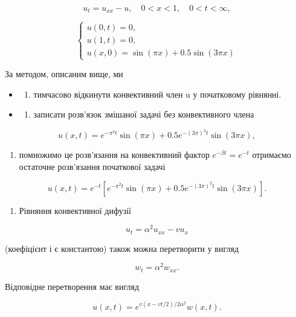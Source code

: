 \documentclass[
  ukrainian,
]{article}
\providecommand{\tightlist}{%
  \setlength{\itemsep}{0pt}\setlength{\parskip}{0pt}}
\begin{document}
\[
u_t = u_{xx} - u, \quad 0 < x < 1, \quad 0 < t < \infty,
\]

\[
\begin{cases} u(0, t) = 0, \\ u(1, t) = 0, \\ u(x, 0) = \sin(\pi x) + 0.5\sin(3\pi x) \end{cases}
\]

За методом, описаним вище, ми

\begin{itemize}
\tightlist
\item
  \begin{enumerate}
  \def\labelenumi{\alph{enumi})}
  \tightlist
  \item
    тимчасово відкинути конвективний член u у початковому рівнянні.
  \end{enumerate}
\item
  \begin{enumerate}
  \def\labelenumi{\alph{enumi})}
  \setcounter{enumi}{1}
  \tightlist
  \item
    записати розв'язок змішаної задачі без конвективного члена
  \end{enumerate}
\end{itemize}

\[
u(x, t) = e^{-\pi^2 t} \sin(\pi x) + 0.5e^{-(3\pi)^2 t} \sin(3\pi x),
\]

\begin{enumerate}
\def\labelenumi{\alph{enumi})}
\setcounter{enumi}{2}
\tightlist
\item
  помножимо це розв'язання на конвективний фактор
  \(e^{-\beta t}=e^{-t}\) отримаємо остаточне розв'язання початкової
  задачі
\end{enumerate}

\[
u(x, t) = e^{-t} \left[ e^{-\pi^2 t} \sin(\pi x) + 0.5e^{-(3\pi)^2 t} \sin(3\pi x) \right].
\]

\begin{enumerate}
\def\labelenumi{\arabic{enumi}.}
\setcounter{enumi}{1}
\tightlist
\item
  Рівняння конвективної дифузії
\end{enumerate}

\[
u_t = \alpha^2 u_{xx} - v u_x
\]

(коефіцієнт і є константою) також можна перетворити у вигляд

\[
w_t = \alpha^2 w_{xx}.
\]

Відповідне перетворення має вигляд

\[
u(x, t) = e^{v(x-vt/2)/2\alpha^2}w(x, t).
\]
\end{document}
